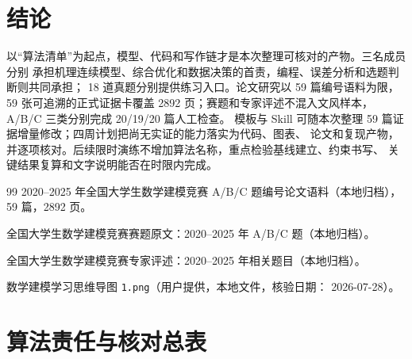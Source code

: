 \documentclass[UTF8,a4paper,12pt]{ctexart}
\begin{document}
\section{结论}

以“算法清单”为起点，模型、代码和写作链才是本次整理可核对的产物。三名成员分别
承担机理连续模型、综合优化和数据决策的首责，编程、误差分析和选题判断则共同承担；
18 道真题分别提供练习入口。论文研究以 59 篇编号语料为限，59 张可追溯的正式证据卡覆盖
2892 页；赛题和专家评述不混入文风样本，A/B/C 三类分别完成 20/19/20 篇人工检查。
模板与 Skill 可随本次整理 59 篇证据增量修改；四周计划把尚无实证的能力落实为代码、图表、
论文和复现产物，并逐项核对。后续限时演练不增加算法名称，重点检验基线建立、约束书写、
关键结果复算和文字说明能否在时限内完成。

\begin{thebibliography}{99}
2020--2025 年全国大学生数学建模竞赛 A/B/C 题编号论文语料（本地归档），
59 篇，2892 页。

全国大学生数学建模竞赛赛题原文：2020--2025 年 A/B/C 题（本地归档）。

全国大学生数学建模竞赛专家评述：2020--2025 年相关题目（本地归档）。

数学建模学习思维导图 \texttt{1.png}（用户提供，本地文件，核验日期：
2026-07-28）。
\end{thebibliography}

\appendix
\section{算法责任与核对总表}
\end{document}
